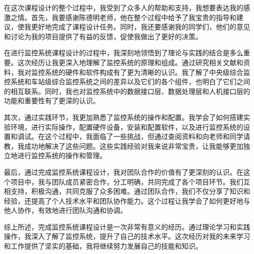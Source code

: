 \acknowledgement
在这次课程设计的整个过程中，我受到了众多人的帮助和支持，我想要表达我的感激之情。首先，我要感谢陈德明老师，他在整个过程中给予了我宝贵的指导和建议，使我更好地完成了课程设计任务。同时，我还要感谢我的同学们，他们的意见和讨论为我的项目提供了有益的反馈，促使我做出了更好的决策。

在进行监控系统课程设计的过程中，我深刻地领悟到了理论与实践的结合是多么重要。这次经历让我更深入地理解了监控系统的原理和组成。通过研究相关文献和资料，我对监控系统的硬件和软件构成有了更为清晰的认识。我了解了中央级综合监控系统和车站级综合监控系统之间的差异以及它们的各个组件，也明白了它们之间的相互联系。同时，我也对监控系统中的数据接口层、数据处理层和人机接口层的功能和重要性有了更深的认识。

其次，通过实践环节，我更加熟悉了监控系统的操作和配置。我学会了如何搭建实验环境，进行实际操作，配置硬件设备，安装和配置软件，以及进行监控系统的设置和调试。在这个过程中，我面临了一些挑战，但通过查阅资料和向老师和同学请教，我成功地解决了这些问题。这些实践经验对我来说非常宝贵，让我能够更加独立地进行监控系统的操作和管理。

最后，通过完成监控系统课程设计，我对团队合作的价值有了更深刻的认识。在这个项目中，我与团队成员紧密合作，分工明确，共同完成了各个项目环节。我们互相支持，积极沟通，共同克服了众多困难。通过团队合作，我们不仅分享了知识和经验，还提高了个人技术水平和团队协作能力。这个过程让我学会了如何更好地与他人协作，有效地进行团队沟通和协调。

综上所述，完成监控系统课程设计是一次非常有意义的经历。通过理论学习和实践操作，我深入了解了监控系统，提升了自己的技术水平。这次经历对我的未来学习和工作提供了坚实的基础，我将继续努力发展自己的技能和知识。